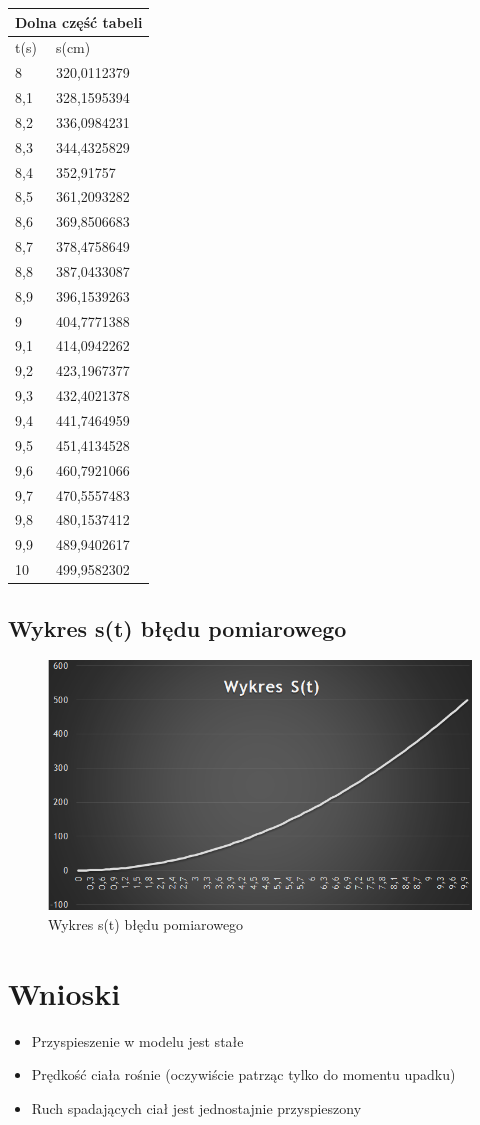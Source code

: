 \documentclass{article}
\begin{document}
\begin{tabular}{|p{4cm}|p{4cm}|}
\hline
\multicolumn{2}{|c|}{Dolna część tabeli}\\ \hline
t(s) & s(cm)\\ \hline
8 &	320,0112379\\ \hline
8,1	& 328,1595394\\ \hline
8,2 &	336,0984231\\ \hline
8,3 &	344,4325829\\ \hline
8,4 &	352,91757\\ \hline
8,5 &	361,2093282\\ \hline
8,6 &	369,8506683\\ \hline
8,7 &	378,4758649\\ \hline
8,8 &	387,0433087\\ \hline
8,9 &	396,1539263\\ \hline
9 &	404,7771388\\ \hline
9,1 &	414,0942262\\ \hline
9,2 &	423,1967377\\ \hline
9,3 &	432,4021378\\ \hline
9,4 &	441,7464959\\ \hline
9,5 &	451,4134528\\ \hline
9,6 &	460,7921066\\ \hline
9,7 &	470,5557483\\ \hline
9,8 &	480,1537412\\ \hline
9,9 & 	489,9402617\\ \hline
10 & 	499,9582302\\ \hline
\end{tabular}

\clearpage
\subsection{Wykres s(t) błędu pomiarowego}

\begin{figure}[h]
	\centering
	\includegraphics[scale=1.2]{wykres.png}
	\caption{Wykres s(t) błędu pomiarowego}
	\label{fig: Obrazek 1}
\end{figure}

\section{Wnioski}
\begin{itemize}
  \item Przyspieszenie w modelu jest stałe
  \item Prędkość ciała rośnie (oczywiście patrząc tylko do momentu upadku)
  \item Ruch spadających ciał jest jednostajnie przyspieszony
\end{itemize}
\end{document}
